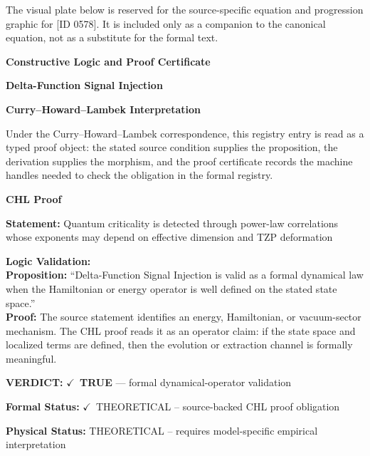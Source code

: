 \begingroup\footnotesize\sloppy
The visual plate below is reserved for the source-specific equation and progression graphic for [ID 0578]. It is included only as a companion to the canonical equation, not as a substitute for the formal text.
\par\endgroup
\ifTZPDarkEdition
{}
\fi

\clearpage
\begingroup\tzpsupportsetup
\noindent\textbf{\fontsize{10.8pt}{12.8pt}\selectfont [ID 0578] Constructive Logic and Proof Certificate}\par
\noindent\textbf{\fontsize{10pt}{12pt}\selectfont Delta-Function Signal Injection}\par
\vspace{0.45em}
\begingroup
\footnotesize
\setlength{\parskip}{0.22em}
\setlength{\parindent}{0pt}
\noindent\textbf{Curry--Howard--Lambek Interpretation}\par
Under the Curry--Howard--Lambek correspondence, this registry entry is read as a typed proof
object: the stated source condition supplies the proposition, the derivation supplies the
morphism, and the proof certificate records the machine handles needed to check the obligation
in the formal registry.

\vspace{0.45em}
\noindent\textbf{CHL Proof}\par
\textbf{Statement:} Quantum criticality is detected through power-law correlations whose exponents may
depend on effective dimension and TZP deformation

\textbf{Logic Validation:}\\
\textbf{Proposition:} ``Delta-Function Signal Injection is valid as a formal dynamical law when the Hamiltonian
or energy operator is well defined on the stated state space.''\\
\textbf{Proof:} The source statement identifies an energy, Hamiltonian, or vacuum-sector mechanism. The
CHL proof reads it as an operator claim: if the state space and localized terms are
defined, then the evolution or extraction channel is formally meaningful.

\textbf{VERDICT:} \ensuremath{\checkmark}\ \textbf{TRUE} --- formal dynamical-operator validation

\textbf{Formal Status:} \ensuremath{\checkmark}\ THEORETICAL -- source-backed CHL proof obligation

\textbf{Physical Status:} THEORETICAL -- requires model-specific empirical interpretation
\par\vspace{0.45em}
\par
\ifTZPDarkEdition
{}
\fi
\endgroup
\endgroup
